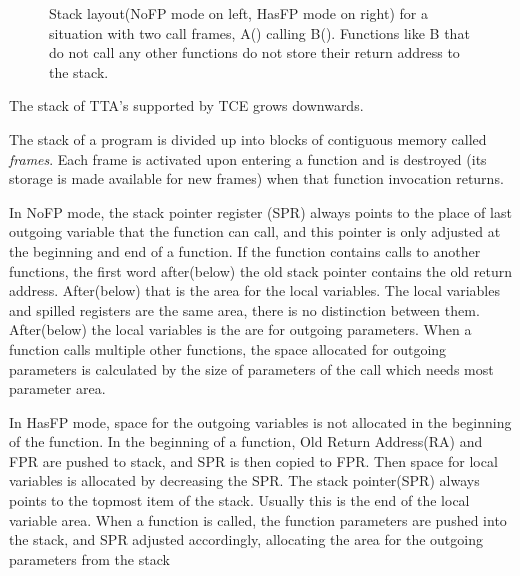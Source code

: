 \documentclass[a4paper,twoside]{tceusermanual}
\begin{document}
\begin{figure}[t]
  \centerline{
  }
  \caption{Stack layout(NoFP mode on left, HasFP mode on right)
for a situation with two call frames, A() calling B().
Functions like B that do not call any other functions do not store
their return address to the stack.}
  \label{fig:stack-frame}
\end{figure}

The stack of TTA's supported by TCE grows downwards.

The stack of a program is divided up into blocks of contiguous memory called
\emph{frames}. Each frame is activated upon entering a function and is
destroyed (its storage is made available for new frames) when that function
invocation returns.

In NoFP mode, the stack pointer register (SPR) always points to the
place of last outgoing variable that the function can call, and this
pointer is only adjusted at the beginning and end of a function.
If the function contains calls to another functions, the first word
after(below) the old stack pointer contains the old return address.
After(below) that is the area for the local variables.
The local variables and spilled registers are the same area, there is no
distinction between them.
After(below) the local variables is the are for outgoing parameters.
When a function calls multiple other functions,
the space allocated for outgoing parameters is calculated by the size
of parameters of the call which needs most parameter area.

In HasFP mode, space for the outgoing variables is not allocated
in the beginning of the function. In the beginning of a function,
Old Return Address(RA) and FPR are pushed to stack,
and SPR is then copied to FPR.
Then space for local variables is allocated by decreasing the SPR.
The stack pointer(SPR) always points to the topmost item
of the stack. Usually this is the end of the local variable area.
When a function is called, the function parameters are pushed into the
stack, and SPR adjusted accordingly, allocating the area for the outgoing
parameters from the stack

\end{document}
